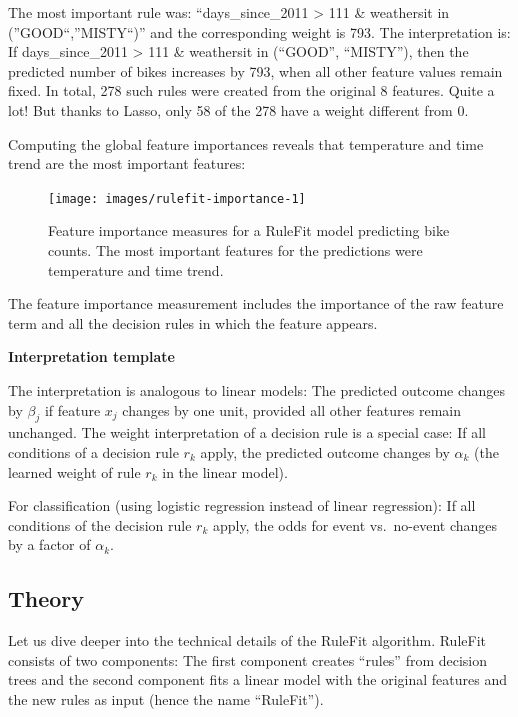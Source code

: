 \documentclass[
  12pt,
]{krantz}
\begin{document}
The most important rule was: ``days\_since\_2011 \textgreater{} 111 \& weathersit in (''GOOD``,''MISTY``)'' and the corresponding weight is 793.
The interpretation is:
If days\_since\_2011 \textgreater{} 111 \& weathersit in (``GOOD'', ``MISTY''), then the predicted number of bikes increases by 793, when all other feature values remain fixed.
In total, 278 such rules were created from the original 8 features.
Quite a lot!
But thanks to Lasso, only 58 of the 278 have a weight different from 0.

Computing the global feature importances reveals that temperature and time trend are the most important features:

\begin{figure}

{\centering \texttt{[image: images/rulefit-importance-1]} 

}

\caption{Feature importance measures for a RuleFit model predicting bike counts. The most important features for the predictions were temperature and time trend.}\label{fig:rulefit-importance}
\end{figure}

The feature importance measurement includes the importance of the raw feature term and all the decision rules in which the feature appears.

\textbf{Interpretation template}

The interpretation is analogous to linear models:
The predicted outcome changes by \(\beta_j\) if feature \(x_j\) changes by one unit, provided all other features remain unchanged.
The weight interpretation of a decision rule is a special case:
If all conditions of a decision rule \(r_k\) apply, the predicted outcome changes by \(\alpha_k\) (the learned weight of rule \(r_k\) in the linear model).

For classification (using logistic regression instead of linear regression):
If all conditions of the decision rule \(r_k\) apply, the odds for event vs.~no-event changes by a factor of \(\alpha_k\).

\hypertarget{theory-1}{%
\subsection{Theory}\label{theory-1}}

Let us dive deeper into the technical details of the RuleFit algorithm.
RuleFit consists of two components:
The first component creates ``rules'' from decision trees and the second component fits a linear model with the original features and the new rules as input (hence the name ``RuleFit'').
\end{document}

